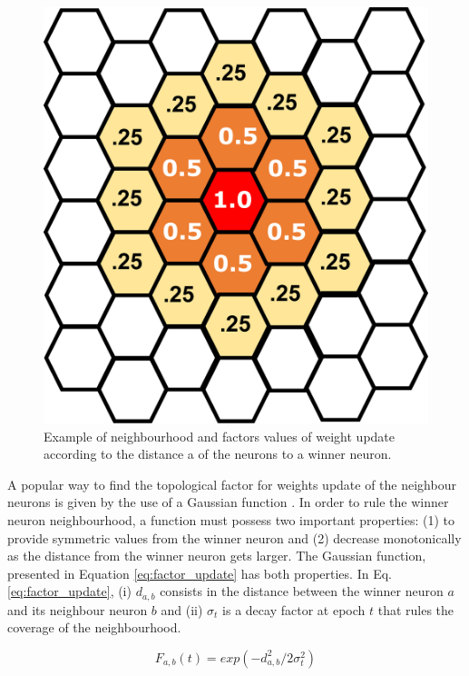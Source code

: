 \begin{figure}[h]
\centering
\includegraphics[scale=0.08]{figs/cooperation.eps}
\caption{Example of neighbourhood and factors values of weight update according to the distance a of the neurons to a winner neuron.}
\label{fig:cooperation}
\end{figure}

A popular way to find the topological factor for weights update of the neighbour neurons is given by the use of a Gaussian function \cite{haykin:2009}. In order to rule the winner neuron neighbourhood, a function must possess two important properties: (1) to provide symmetric values from the winner neuron and (2) decrease monotonically as the distance from the winner neuron gets larger. The Gaussian function, presented in Equation \ref{eq:factor_update} has both properties. In Eq. \ref{eq:factor_update}, (i) $d_{a,b}$ consists in the distance between the winner neuron $a$ and its neighbour neuron $b$ and (ii) $\sigma_{t}$ is a decay factor at epoch $t$ that rules the coverage of the neighbourhood.  

\begin{equation}
    F_{a,b}(t) = exp(-d_{a,b}^2/2\sigma_{t}^2)
    \label{eq:factor_update}
\end{equation}

